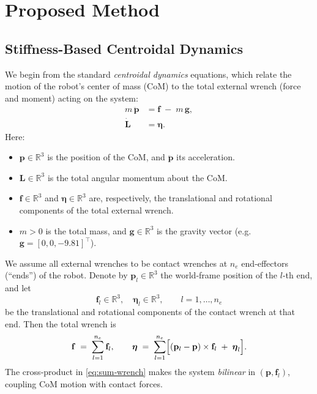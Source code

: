 \documentclass[main.tex]{subfiles}
\begin{document}
\begin{sloppypar}
\section{Proposed Method}
\label{sec:proposedmethods}
\subsection{Stiffness-Based Centroidal Dynamics}

We begin from the standard \emph{centroidal dynamics} equations, which relate the motion of the robot’s center of mass (CoM) to the total external wrench (force and moment) acting on the system:
\begin{subequations}\label{eq:centroidal‐dynamics}
\begin{align}
m\,\ddot{\mathbf{p}} &= \mathbf{f} \;-\; m\,\mathbf{g}, \label{eq:centroidal‐dynamics:trans}\\
\dot{\mathbf{L}}     &= \boldsymbol{\eta}.      \label{eq:centroidal‐dynamics:rot}
\end{align}
\end{subequations}
Here:
\begin{itemize}
  \item $\mathbf{p}\in\mathbb{R}^3$ is the position of the CoM, and $\ddot{\mathbf{p}}$ its acceleration.
  \item $\mathbf{L}\in\mathbb{R}^3$ is the total angular momentum about the CoM.
  \item $\mathbf{f}\in\mathbb{R}^3$ and $\boldsymbol{\eta}\in\mathbb{R}^3$ are, respectively, the translational and rotational components of the total external wrench.
  \item $m>0$ is the total mass, and $\mathbf{g}\in\mathbb{R}^3$ is the gravity vector (e.g.\ $\mathbf{g}=[0,0,-9.81]^\top$).
\end{itemize}
We assume all external wrenches to be contact wrenches at $n_e$ end‐effectors (``ends'') of the robot.  Denote by $\mathbf{p}_l\in\mathbb{R}^3$ the world‐frame position of the $l$-th end, and let
\[
\mathbf{f}_l\in\mathbb{R}^3,\quad
\boldsymbol{\eta}_l\in\mathbb{R}^3,\qquad l=1,\dots,n_e
\]
be the translational and rotational components of the contact wrench at that end.  Then the total wrench is
\begin{equation}\label{eq:sum‐wrench}
\mathbf{f}    \;=\;\sum_{l=1}^{n_e} \mathbf{f}_l,
\qquad
\boldsymbol{\eta} \;=\;\sum_{l=1}^{n_e}\Bigl[(\mathbf{p}_l - \mathbf{p})\times \mathbf{f}_l \;+\;\boldsymbol{\eta}_l\Bigr].
\end{equation}
The cross‐product in \eqref{eq:sum‐wrench} makes the system \emph{bilinear} in $(\mathbf{p},\mathbf{f}_l)$, coupling CoM motion with contact forces.
\medskip

\end{sloppypar}
\end{document}
